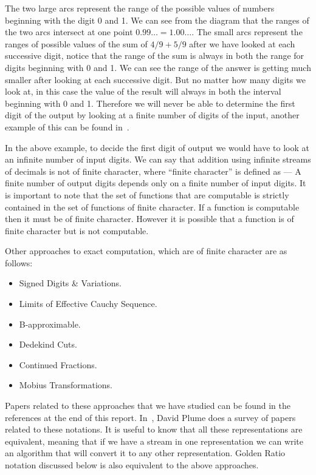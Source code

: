 \documentclass{cs4rep}
\begin{document}
The two large arcs represent the range of the possible values of
numbers beginning with the digit 0 and 1. We can see from the diagram
that the ranges of the two arcs intersect at one point $0.99 \ldots =
1.00 \ldots$. The small arcs represent the ranges of possible values
of the sum of $4/9 + 5/9$ after we have looked at each successive
digit, notice that the range of the sum is always in both the range
for digits beginning with 0 and 1. We can see the range of the answer
is getting much smaller after looking at each successive digit. But no
matter how many digits we look at, in this case the value of the
result will always in both the interval beginning with 0 and 1.
Therefore we will never be able to determine the first digit of the
output by looking at a finite number of digits of the input, another
example of this can be found in~\cite{kn:DiGianantonio}.

In the above example, to decide the first digit of output we would
have to look at an infinite number of input digits.  We can say that
addition using infinite streams of decimals is not of finite
character, where ``finite character'' is defined as --- A finite
number of output digits depends only on a finite number of input
digits.  It is important to note that the set of functions that are
computable is strictly contained in the set of functions of finite
character. If a function is computable then it must be of finite
character. However it is possible that a function is of finite
character but is not computable.

Other approaches to exact computation, which are of finite character
are as follows:
\begin{itemize}
\item Signed Digits \& Variations.
\item Limits of Effective Cauchy Sequence.
\item B-approximable.
\item Dedekind Cuts.
\item Continued Fractions.
\item Mobius Transformations.
\end{itemize}

Papers related to these approaches that we have studied can be found
in the references at the end of this report.  In~\cite{kn:Plume},
David Plume does a survey of papers related to these notations.  It is
useful to know that all these representations are equivalent, meaning
that if we have a stream in one representation we can write an
algorithm that will convert it to any other representation.  Golden
Ratio notation discussed below is also equivalent to the above
approaches.
\end{document}
